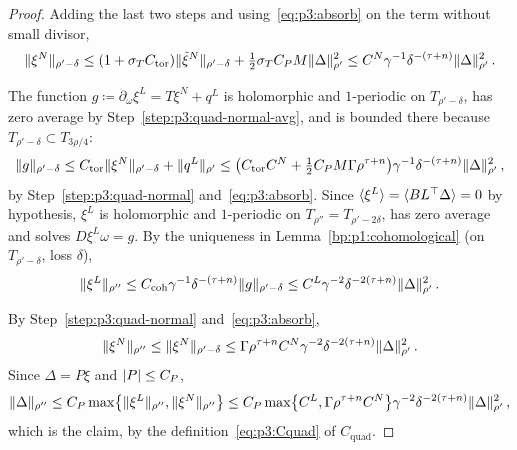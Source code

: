 \begin{proof}
\label{step:p3:quad-normal}
Adding the last two steps and using~\eqref{eq:p3:absorb} on the term without small divisor,
\begin{equation*}
\lVert \xi^N\rVert_{\rho'-\delta}\le(1+\sigma_TC_{\mathrm{tor}})\lVert \tilde\xi^N\rVert_{\rho'-\delta}
+\tfrac12\sigma_TC_PM\lVert \Delta\rVert_{\rho'}^2\le C^N\gamma^{-1}\delta^{-(\tau+n)}\lVert \Delta\rVert_{\rho'}^2\,.
\end{equation*}

\label{step:p3:quad-tangent}
The function $g\coloneqq\partial_\omega\xi^L=T\xi^N+q^L$ is holomorphic and $1$-periodic on
$T_{\rho'-\delta}$, has zero average by Step~\ref{step:p3:quad-normal-avg}, and is bounded there because
$T_{\rho'-\delta}\subset T_{3\rho/4}$:
\begin{equation*}
\lVert g\rVert_{\rho'-\delta}\le C_{\mathrm{tor}}\lVert \xi^N\rVert_{\rho'-\delta}+\lVert q^L\rVert_{\rho'}
\le\bigl(C_{\mathrm{tor}}C^N+\tfrac12C_PM\Gamma\rho^{\tau+n}\bigr)\gamma^{-1}\delta^{-(\tau+n)}
\lVert \Delta\rVert_{\rho'}^2\,,
\end{equation*}
by Step~\ref{step:p3:quad-normal} and~\eqref{eq:p3:absorb}. Since $\langle \xi^L\rangle=\langle BL^\top\Delta\rangle=0$
by hypothesis, $\xi^L$ is holomorphic and $1$-periodic on $T_{\rho''}=T_{\rho'-2\delta}$, has zero
average and solves $D\xi^L\omega=g$. By the uniqueness in Lemma~\ref{bp:p1:cohomological} (on
$T_{\rho'-\delta}$, loss $\delta$),
\begin{equation*}
\lVert \xi^L\rVert_{\rho''}\le C_{\mathrm{coh}}\gamma^{-1}\delta^{-(\tau+n)}\lVert g\rVert_{\rho'-\delta}
\le C^L\gamma^{-2}\delta^{-2(\tau+n)}\lVert \Delta\rVert_{\rho'}^2\,.
\end{equation*}

\label{step:p3:quad-combine}
By Step~\ref{step:p3:quad-normal} and~\eqref{eq:p3:absorb},
\begin{equation*}
\lVert \xi^N\rVert_{\rho''}\le\lVert \xi^N\rVert_{\rho'-\delta}\le\Gamma\rho^{\tau+n}C^N\gamma^{-2}
\delta^{-2(\tau+n)}\lVert \Delta\rVert_{\rho'}^2\,.
\end{equation*}
Since $\Delta=P\xi$ and $\lvert P\rvert\le C_P$,
\begin{equation*}
\lVert \Delta\rVert_{\rho''}\le C_P\max\bigl\{\lVert \xi^L\rVert_{\rho''},\lVert \xi^N\rVert_{\rho''}\bigr\}
\le C_P\max\bigl\{C^L,\Gamma\rho^{\tau+n}C^N\bigr\}\gamma^{-2}\delta^{-2(\tau+n)}\lVert \Delta\rVert_{\rho'}^2\,,
\end{equation*}
which is the claim, by the definition~\eqref{eq:p3:Cquad} of $C_{\mathrm{quad}}$.
\end{proof}

